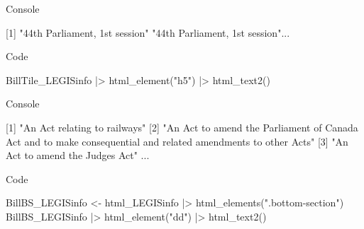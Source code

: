 \documentclass[
  letterpaper,
  DIV=11,
  numbers=noendperiod]{scrreprt}
\newenvironment{Shaded}{\begin{snugshade}}{\end{snugshade}}
\newcommand{\ExtensionTok}[1]{\textcolor[rgb]{0.00,0.23,0.31}{#1}}
\newcommand{\KeywordTok}[1]{\textcolor[rgb]{0.00,0.23,0.31}{#1}}
\newcommand{\NormalTok}[1]{\textcolor[rgb]{0.00,0.23,0.31}{#1}}
\newcommand{\OperatorTok}[1]{\textcolor[rgb]{0.37,0.37,0.37}{#1}}
\newcommand{\StringTok}[1]{\textcolor[rgb]{0.13,0.47,0.30}{#1}}
\begin{document}
Console

\begin{Shaded}
\begin{Highlighting}[]
\ExtensionTok{[1]} \StringTok{"44th Parliament, 1st session"} \StringTok{"44th Parliament, 1st session"}\NormalTok{...}
\end{Highlighting}
\end{Shaded}

Code

\begin{Shaded}
\begin{Highlighting}[]
\ExtensionTok{BillTile\_LEGISinfo} \KeywordTok{|}\OperatorTok{\textgreater{}}\NormalTok{ html\_element}\KeywordTok{(}\StringTok{"h5"}\KeywordTok{)} \KeywordTok{|}\OperatorTok{\textgreater{}}\NormalTok{ html\_text2}\KeywordTok{()}
\end{Highlighting}
\end{Shaded}

Console

\begin{Shaded}
\begin{Highlighting}[]
\ExtensionTok{[1]} \StringTok{"An Act relating to railways"}                                                                                                                                                                                                                                                                                  
 \ExtensionTok{[2]} \StringTok{"An Act to amend the Parliament of Canada Act and to make }
\StringTok{ consequential and related amendments to other Acts"}                                                                                                                                                                                                  
 \ExtensionTok{[3]} \StringTok{"An Act to amend the Judges Act"}   
\ExtensionTok{...}
\end{Highlighting}
\end{Shaded}

Code

\begin{Shaded}
\begin{Highlighting}[]
\ExtensionTok{BillBS\_LEGISinfo} \OperatorTok{\textless{}}\NormalTok{{-} html\_LEGISinfo }\KeywordTok{|}\OperatorTok{\textgreater{}}\NormalTok{ html\_elements}\KeywordTok{(}\StringTok{".bottom{-}section"}\KeywordTok{)}
\ExtensionTok{BillBS\_LEGISinfo} \KeywordTok{|}\OperatorTok{\textgreater{}}\NormalTok{ html\_element}\KeywordTok{(}\StringTok{"dd"}\KeywordTok{)} \KeywordTok{|}\OperatorTok{\textgreater{}}\NormalTok{ html\_text2}\KeywordTok{()}
\end{Highlighting}
\end{Shaded}
\end{document}
